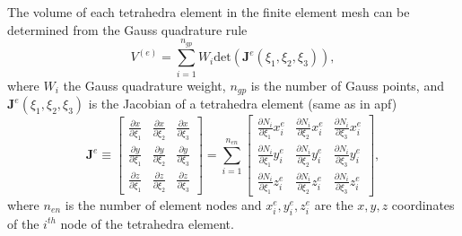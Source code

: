 \documentclass[12pt,aps,pre]{revtex4}
\begin{document}
The volume of each tetrahedra element in the finite element mesh can be determined from the Gauss quadrature rule
%
\begin{equation}
V^{(e)} = \sum_{i=1}^{n_{gp}} W_i \text{det}(\pmb{J}^e(\xi_1,\xi_2,\xi_3)),
\end{equation}
%
where $W_i$ the Gauss quadrature weight, $n_{gp}$ is the number of Gauss points, and $\pmb{J}^e(\xi_1,\xi_2,\xi_3)$ is the Jacobian of a tetrahedra element (same as in apf)
%
\begin{equation}
\pmb{J}^e \equiv 
\begin{bmatrix}
\frac{\partial x}{\partial \xi_1} & \frac{\partial x}{\partial \xi_2} & \frac{\partial x}{\partial \xi_3} \\
\frac{\partial y}{\partial \xi_1} & \frac{\partial y}{\partial \xi_2} & \frac{\partial y}{\partial \xi_3} \\
\frac{\partial z}{\partial \xi_1} & \frac{\partial z}{\partial \xi_2} & \frac{\partial z}{\partial \xi_3} 
\end{bmatrix} = 
%
\sum_{i=1}^{n_{en}}
\begin{bmatrix}
\frac{\partial N_i}{\partial \xi_1} x_i^e & \frac{\partial N_i}{\partial \xi_2} x_i^e & \frac{\partial N_i}{\partial \xi_3} x_i^e \\
%
\frac{\partial N_i}{\partial \xi_1}y_i^e & \frac{\partial N_i}{\partial \xi_2}y_i^e & \frac{\partial N_i}{\partial \xi_3}y_i^e \\
%
\frac{\partial N_i}{\partial \xi_1}z_i^e & \frac{\partial N_i}{\partial \xi_2}z_i^e & \frac{\partial N_i}{\partial \xi_3}z_i^e 
\end{bmatrix},
\label{eq:jacobian}
\end{equation}
%
where $n_{en}$ is the number of element nodes and $x_i^e, y_i^e, z_i^e$ are the $x,y,z$ coordinates of the $i^{th}$ node of the tetrahedra element.
\end{document}
